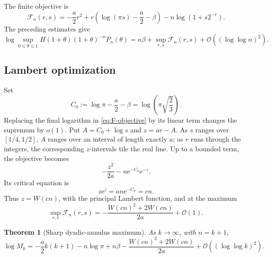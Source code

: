\documentclass[11pt]{article}
\newtheorem{theorem}{Theorem}[section]
\theoremstyle{definition}
\theoremstyle{remark}
\newcommand{\e}{\mathrm e}
\newcommand{\bigO}{\mathcal O}
\begin{document}
The finite objective is
\begin{equation}
 \mathcal F_n(r,s)
 =-\frac a2r^2
 +r\left(\log(\pi s)-\frac a2-\beta\right)
 -n\log(1+s2^{-r}).
 \label{eq:F-objective}
\end{equation}
The preceding estimates give
\begin{equation}
 \log\sup_{0\le\theta\le1}
 H(1+\theta)(1+\theta)^{-n}P_n(\theta)
 =n\beta+\sup_{r,s}\mathcal F_n(r,s)
 +\bigO((\log\log n)^2).
 \label{eq:Fn-reduction}
\end{equation}

\subsection{Lambert optimization}

Set
\begin{equation}
 C_0:=\log\pi-\frac a2-\beta
 =\log\!\left(\pi\sqrt{\frac23}\right).
 \label{eq:C0}
\end{equation}
Replacing the final logarithm in \eqref{eq:F-objective} by its linear term
changes the supremum by \(o(1)\).  Put
\(A=C_0+\log s\) and \(z=ar-A\).  As \(s\) ranges over \([1/4,1/2]\),
\(A\) ranges over an interval of length exactly \(a\); as \(r\) runs through
the integers, the corresponding \(z\)-intervals tile the real line.  Up to a
bounded term, the objective becomes
\begin{equation}
 -\frac{z^2}{2a}-n\e^{-C_0}\e^{-z}.
 \label{eq:z-objective}
\end{equation}
Its critical equation is
\begin{equation}
 z\e^z=an\e^{-C_0}=cn.
 \label{eq:Lambert-eq}
\end{equation}
Thus \(z=W(cn)\), with the principal Lambert function\cite{corless}, and at the maximum
\begin{equation}
 \sup_{r,s}\mathcal F_n(r,s)
 =-\frac{W(cn)^2+2W(cn)}{2a}+\bigO(1).
 \label{eq:Lambert-sup}
\end{equation}

\begin{theorem}[Sharp dyadic-annulus maximum]
\label{thm:annulus}
As \(k\to\infty\), with \(n=k+1\),
\begin{equation}
 \boxed{
 \log M_k
 =-\frac a2k(k+1)-n\log\pi+n\beta
 -\frac{W(cn)^2+2W(cn)}{2a}
 +\bigO((\log\log k)^2).}
 \label{eq:annulus-main}
\end{equation}
\end{theorem}
\end{document}
